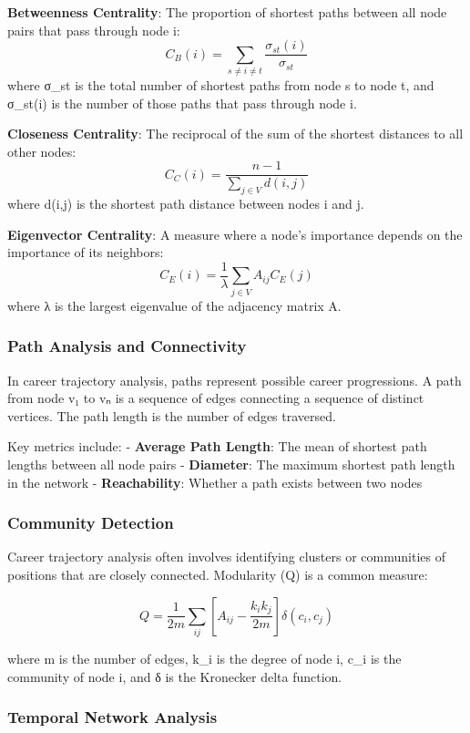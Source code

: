 \documentclass[
  letterpaper,
  DIV=11,
  numbers=noendperiod]{scrartcl}
\begin{document}
\textbf{Betweenness Centrality}: The proportion of shortest paths
between all node pairs that pass through node i:
\[ C_B(i) = \sum_{s \neq i \neq t} \frac{\sigma_{st}(i)}{\sigma_{st}} \]
where σ\_st is the total number of shortest paths from node s to node t,
and σ\_st(i) is the number of those paths that pass through node i.

\textbf{Closeness Centrality}: The reciprocal of the sum of the shortest
distances to all other nodes:
\[ C_C(i) = \frac{n-1}{\sum_{j \in V} d(i,j)} \] where d(i,j) is the
shortest path distance between nodes i and j.

\textbf{Eigenvector Centrality}: A measure where a node's importance
depends on the importance of its neighbors:
\[ C_E(i) = \frac{1}{\lambda} \sum_{j \in V} A_{ij} C_E(j) \] where λ is
the largest eigenvalue of the adjacency matrix A.

\subsubsection{Path Analysis and
Connectivity}\label{path-analysis-and-connectivity}

In career trajectory analysis, paths represent possible career
progressions. A path from node v₁ to vₙ is a sequence of edges
connecting a sequence of distinct vertices. The path length is the
number of edges traversed.

Key metrics include: - \textbf{Average Path Length}: The mean of
shortest path lengths between all node pairs - \textbf{Diameter}: The
maximum shortest path length in the network - \textbf{Reachability}:
Whether a path exists between two nodes

\subsubsection{Community Detection}\label{community-detection}

Career trajectory analysis often involves identifying clusters or
communities of positions that are closely connected. Modularity (Q) is a
common measure:

\[ Q = \frac{1}{2m} \sum_{ij} \left[ A_{ij} - \frac{k_i k_j}{2m} \right] \delta(c_i, c_j) \]

where m is the number of edges, k\_i is the degree of node i, c\_i is
the community of node i, and δ is the Kronecker delta function.

\subsubsection{Temporal Network
Analysis}\label{temporal-network-analysis}
\end{document}
